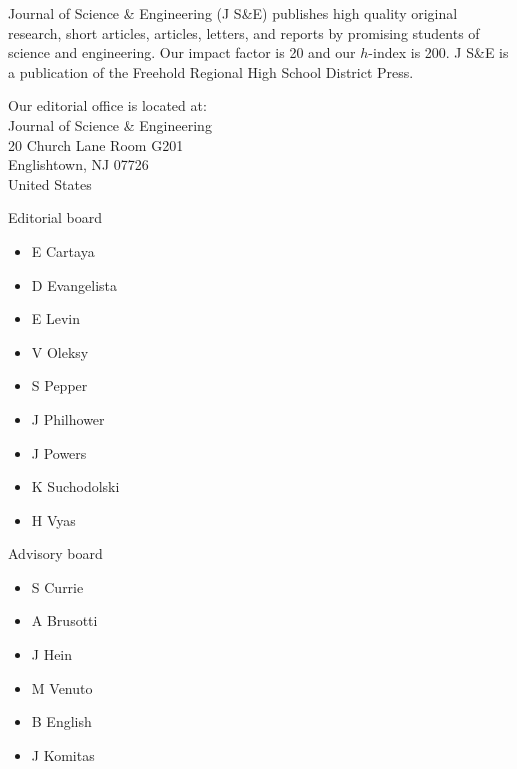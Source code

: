 \noindent Journal of Science \& Engineering (J S\&E) publishes high quality original research, short articles, articles, letters, and reports by promising students of science and engineering.  Our impact factor is 20 and our $h$-index is 200.  J S\&E is a publication of the Freehold Regional High School District Press. 
\vspace{2ex}

\noindent Our editorial office is located at:\\

\noindent Journal of Science \& Engineering\\20 Church Lane Room G201\\Englishtown, NJ 07726\\United States
\vspace{2ex}

\noindent\small Editorial board
\begin{itemize}
\itemsep-0.5em
\item[] E Cartaya
\item[] D Evangelista
\item[] E Levin
\item[] V Oleksy
\item[] S Pepper
\item[] J Philhower
\item[] J Powers
\item[] K Suchodolski
\item[] H Vyas
\end{itemize}

\noindent\small Advisory board
\begin{itemize}
\itemsep-0.5em
\item[] S Currie
\item[] A Brusotti
\item[] J Hein
\item[] M Venuto
\item[] B English
\item[] J Komitas
\end{itemize}

\vfill

\vspace{2ex}

\vspace{2ex}

\vspace{2ex}
